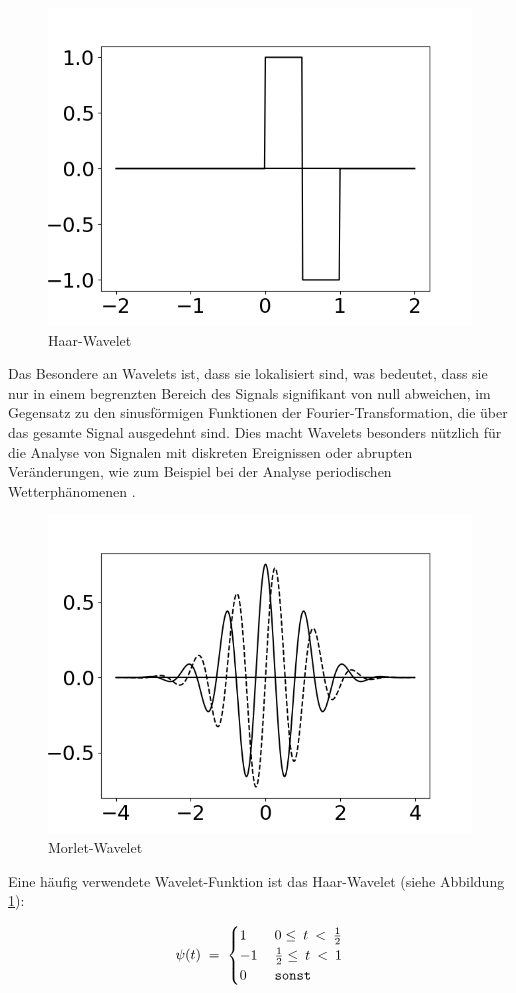 \begin{figure}[H]
    \centering
    \includegraphics[width=0.5\linewidth]{images/haar.png}
    \caption{Haar-Wavelet}
    \label{fig:haar-wavelet}
\end{figure}

Das Besondere an Wavelets ist, dass sie lokalisiert sind, was bedeutet, dass sie nur in einem begrenzten Bereich des Signals signifikant von null abweichen, im Gegensatz zu den sinusförmigen Funktionen der Fourier-Transformation, die über das gesamte Signal ausgedehnt sind. Dies macht Wavelets besonders nützlich für die Analyse von Signalen mit diskreten Ereignissen oder abrupten Veränderungen, wie zum Beispiel bei der Analyse periodischen Wetterphänomenen \cite{Schulte2019}.

\begin{figure}[H]
    \centering
    \includegraphics[width=0.5\linewidth]{images/morlet.png}
    \caption{Morlet-Wavelet}
    \label{fig:morlet-wavelet}
\end{figure}

Eine häufig verwendete Wavelet-Funktion ist das Haar-Wavelet (siehe Abbildung \ref{fig:haar-wavelet}):

\begin{equation} \label{eq:haar}
    \psi (t) \; = \; 
    \begin{cases}
        1 \quad &0 \leq \: t \: < \: {1 \over 2} \\
        -1      &{1 \over 2}  \leq \: t \: < \: 1 \\
        0       &\texttt{sonst}
    \end{cases}
\end{equation}

